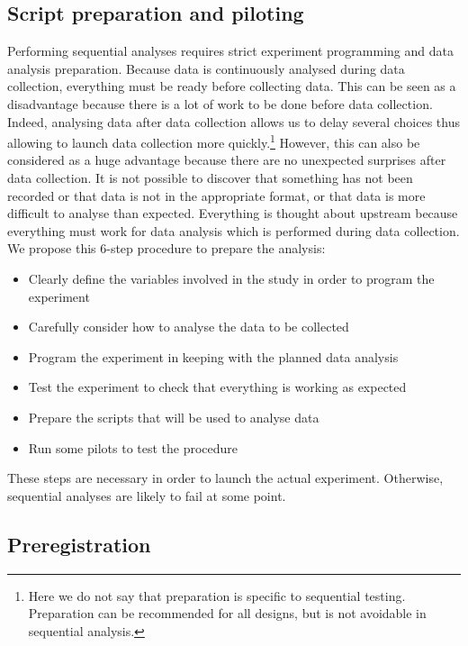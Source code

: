 \documentclass[a4paper,jou,natbib,floatsintext,donotrepeattitle]{apa6}
\begin{document}
\subsection{Script preparation and piloting}

Performing sequential analyses requires strict experiment programming and data analysis preparation. Because data is continuously analysed during data collection, everything must be ready before collecting data. This can be seen as a disadvantage because there is a lot of work to be done before data collection. Indeed, analysing data after data collection allows us to delay several choices thus allowing to launch data collection more quickly.\footnote{Here we do not say that preparation is specific to sequential testing. Preparation can be recommended for all designs, but is not avoidable in sequential analysis.} However, this can also be considered as a huge advantage because there are no unexpected surprises after data collection. It is not possible to discover that something has not been recorded or that data is not in the appropriate format, or that data is more difficult to analyse than expected. Everything is thought about upstream because everything must work for data analysis which is performed during data collection. We propose this 6-step procedure to prepare the analysis:

\begin{itemize}
    \item Clearly define the variables involved in the study in order to program the experiment
    \item Carefully consider how to analyse the data to be collected
    \item Program the experiment in keeping with the planned data analysis
    \item Test the experiment to check that everything is working as expected
    \item Prepare the scripts that will be used to analyse data
    \item Run some pilots to test the procedure
\end{itemize}

These steps are necessary in order to launch the actual experiment. Otherwise, sequential analyses are likely to fail at some point.

\subsection{Preregistration}
\end{document}
